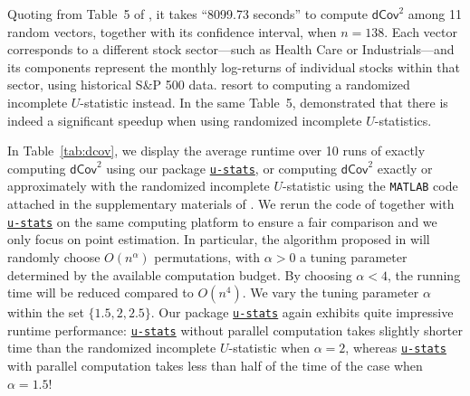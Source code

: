 \documentclass[12pt]{article}
\newcommand{\libref}[2]{\href{#2}{\texttt{#1}}}
\def\package{\libref{u-stats}{https://github.com/zrq1706/U-Statistics-Python}}
\theoremstyle{plain}
\theoremstyle{definition}
\newcommand{\Lin}[1]{{\color{purple}{#1}}}
\def\package{\libref{u-stats}{https://github.com/zrq1706/U-Statistics-Python}}
\begin{document}
\begin{bibunit}[agsm]
Quoting from Table~5 of \citet{shao2025u}, it takes ``8099.73 seconds'' to compute $\mathsf{dCov}^2$ among 11 random vectors, together with its confidence interval, when $n = 138$. Each vector corresponds to a different stock sector—such as Health Care or Industrials—and its components represent the monthly log-returns of individual stocks within that sector, using historical S\&P 500 data. \citet{shao2025u} resort to computing a randomized incomplete $U$-statistic instead. In the same Table~5, \citet{shao2025u} demonstrated that there is indeed a significant speedup when using randomized incomplete $U$-statistics. %

In Table~\ref{tab:dcov}, we display the average runtime over 10 runs of exactly computing $\mathsf{dCov}^2$ using our package \package{}, or computing $\mathsf{dCov}^2$ exactly or approximately with the randomized incomplete $U$-statistic using the \texttt{MATLAB} code attached in the supplementary materials of \citet{shao2025u}. We rerun the code of \citet{shao2025u} together with \package{} on the same computing platform to ensure a fair comparison and we only focus on point estimation. In particular, the algorithm proposed in \citet{shao2025u} will randomly choose $O (n^\alpha)$ %
permutations, with $\alpha > 0$ a tuning parameter determined by the available computation budget. By choosing $\alpha < 4$, the running time will be reduced compared to $O (n^{4})$. We vary the tuning parameter $\alpha$ within the set $\{1.5, 2, 2.5\}$. Our package \package{} again exhibits quite impressive runtime performance: \package{} without parallel computation takes slightly shorter time than the randomized incomplete $U$-statistic when $\alpha = 2$, whereas \package{} with parallel computation takes less than half of the time of the case when $\alpha = 1.5$!




\end{bibunit}
\end{document}
